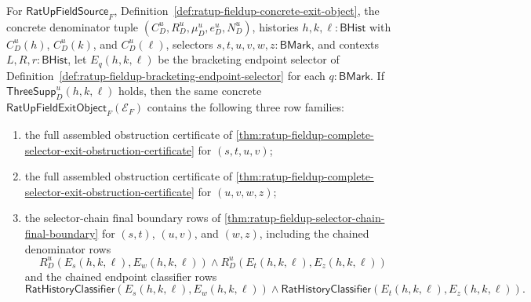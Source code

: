 \begin{theorem}
\label{thm:ratup-fieldup-concrete-two-step-obstruction-chain-package}
For $\mathsf{RatUpFieldSource}_F$,
Definition~\ref{def:ratup-fieldup-concrete-exit-object}, the concrete
denominator tuple $(C_D^u,R_D^u,\mu_D^u,e_D^u,N_D^u)$, histories
$h,k,\ell:\mathsf{BHist}$ with $C_D^u(h)$, $C_D^u(k)$, and $C_D^u(\ell)$,
selectors $s,t,u,v,w,z:\mathsf{BMark}$, and contexts
$L,R,r:\mathsf{BHist}$, let $E_q(h,k,\ell)$ be the bracketing endpoint selector
of Definition~\ref{def:ratup-fieldup-bracketing-endpoint-selector} for each
$q:\mathsf{BMark}$. If $\mathsf{ThreeSupp}_D^u(h,k,\ell)$ holds, then the same
concrete $\mathsf{RatUpFieldExitObject}_F(\mathcal E_F)$ contains the following
three row families:
\begin{enumerate}
  \item the full assembled obstruction certificate of
  \autoref{thm:ratup-fieldup-complete-selector-exit-obstruction-certificate} for
  $(s,t,u,v)$;
  \item the full assembled obstruction certificate of
  \autoref{thm:ratup-fieldup-complete-selector-exit-obstruction-certificate} for
  $(u,v,w,z)$;
  \item the selector-chain final boundary rows of
  \autoref{thm:ratup-fieldup-selector-chain-final-boundary} for $(s,t)$,
  $(u,v)$, and $(w,z)$, including the chained denominator rows
  $$
  R_D^u(E_s(h,k,\ell),E_w(h,k,\ell))
  \land
  R_D^u(E_t(h,k,\ell),E_z(h,k,\ell))
  $$
  and the chained endpoint classifier rows
  $$
  \mathsf{RatHistoryClassifier}(E_s(h,k,\ell),E_w(h,k,\ell))
  \land
  \mathsf{RatHistoryClassifier}(E_t(h,k,\ell),E_z(h,k,\ell)).
  $$
\end{enumerate}
\end{theorem}
